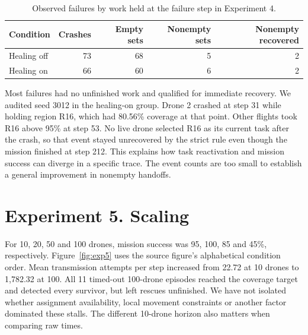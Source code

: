 \begin{table}[!htbp]
\centering
\caption{Observed failures by work held at the failure step in Experiment 4.}
\label{tab:events}
\begin{tabularx}{\linewidth}{@{}Yrrrr@{}}
\toprule
Condition & Crashes & Empty sets & Nonempty sets & Nonempty recovered\\
\midrule
Healing off & 73 & 68 & 5 & 2\\
Healing on & 66 & 60 & 6 & 2\\
\bottomrule
\end{tabularx}
\end{table}

Most failures had no unfinished work and qualified for immediate recovery. We audited seed 3012 in the healing-on group. Drone 2 crashed at step 31 while holding region R16, which had 80.56\% coverage at that point. Other flights took R16 above 95\% at step 53. No live drone selected R16 as its current task after the crash, so that event stayed unrecovered by the strict rule even though the mission finished at step 212. This explains how task reactivation and mission success can diverge in a specific trace. The event counts are too small to establish a general improvement in nonempty handoffs.

\FloatBarrier

\section{Experiment 5. Scaling}
For 10, 20, 50 and 100 drones, mission success was 95, 100, 85 and 45\%, respectively. Figure~\ref{fig:exp5} uses the source figure's alphabetical condition order. Mean transmission attempts per step increased from 22.72 at 10 drones to 1,782.32 at 100. All 11 timed-out 100-drone episodes reached the coverage target and detected every survivor, but left rescues unfinished. We have not isolated whether assignment availability, local movement constraints or another factor dominated these stalls. The different 10-drone horizon also matters when comparing raw times.

\FloatBarrier

